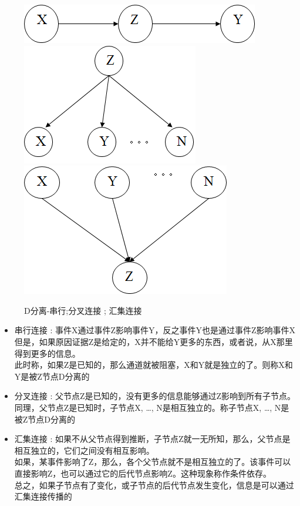 \documentclass[UTF8,a4paper]{ctexart}
\begin{document}
\begin{figure}[H]
	\centering
	\includegraphics[scale = 0.3]{assets/ArtificialIntelligence/2018-01-08-23-14-07.png}
	\includegraphics[scale = 0.3]{assets/ArtificialIntelligence/2018-01-08-23-14-35.png}
	\includegraphics[scale = 0.3]{assets/ArtificialIntelligence/2018-01-08-23-14-43.png}
	\caption{D分离-串行;分叉连接 ; 汇集连接}
\end{figure}
\begin{itemize}
	\item 串行连接 : 事件X通过事件Z影响事件Y，反之事件Y也是通过事件Z影响事件X
	      \\ 但是，如果原因证据Z是给定的，X并不能给Y更多的东西，或者说，从X那里得到更多的信息。
	      \\此时称，如果Z是已知的，那么通道就被阻塞，X和Y就是独立的了。则称X和Y是被Z节点D分离的
	\item 分叉连接 : 父节点Z是已知的，没有更多的信息能够通过Z影响到所有子节点。同理，父节点Z是已知时，子节点X, …, N是相互独立的。称子节点X, …, N是被Z节点D分离的
	\item 汇集连接 : 如果不从父节点得到推断，子节点Z就一无所知，那么，父节点是相互独立的，它们之间没有相互影响。
	      \\如果，某事件影响了Z，那么，各个父节点就不是相互独立的了。该事件可以直接影响Z，也可以通过它的后代节点影响Z。这种现象称作条件依存。\\总之，如果子节点有了变化，或子节点的后代节点发生变化，信息是可以通过汇集连接传播的
\end{itemize}
\end{document}
